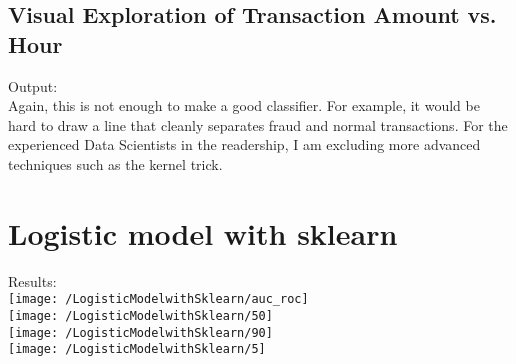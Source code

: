 \documentclass[17pt]{report}
\begin{document}
\subsection{Visual Exploration of Transaction Amount vs. Hour}

Output:\\
Again, this is not enough to make a good classifier. For example, it would be hard to draw a line that cleanly
separates fraud and normal transactions. For the experienced Data Scientists in the readership, I am excluding
more advanced techniques such as the kernel trick.\\
\section{Logistic model with sklearn}

Results:\\
\texttt{[image: /LogisticModelwithSklearn/auc\_roc]}\\
\texttt{[image: /LogisticModelwithSklearn/50]}\\
\texttt{[image: /LogisticModelwithSklearn/90]}\\
\texttt{[image: /LogisticModelwithSklearn/5]}
\end{document}
